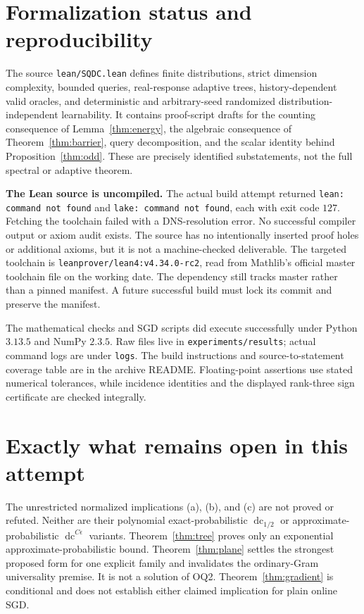 \documentclass[11pt]{article}
\DeclareMathOperator{\dc}{dc}
\newcommand{\1}{\mathbf 1}
\begin{document}
\section{Formalization status and reproducibility}
The source \texttt{lean/SQDC.lean} defines finite distributions, strict dimension complexity, bounded queries, real-response adaptive trees, history-dependent valid oracles, and deterministic and arbitrary-seed randomized distribution-independent learnability. It contains proof-script drafts for the counting consequence of Lemma~\ref{thm:energy}, the algebraic consequence of Theorem~\ref{thm:barrier}, query decomposition, and the scalar identity behind Proposition~\ref{thm:odd}. These are precisely identified substatements, not the full spectral or adaptive theorem.

\textbf{The Lean source is uncompiled.} The actual build attempt returned \texttt{lean: command not found} and \texttt{lake: command not found}, each with exit code $127$. Fetching the toolchain failed with a DNS-resolution error. No successful compiler output or axiom audit exists. The source has no intentionally inserted proof holes or additional axioms, but it is not a machine-checked deliverable. The targeted toolchain is \texttt{leanprover/lean4:v4.34.0-rc2}, read from Mathlib's official master toolchain file on the working date. The dependency still tracks master rather than a pinned manifest. A future successful build must lock its commit and preserve the manifest.

The mathematical checks and SGD scripts did execute successfully under Python $3.13.5$ and NumPy $2.3.5$. Raw files live in \texttt{experiments/results}; actual command logs are under \texttt{logs}. The build instructions and source-to-statement coverage table are in the archive README. Floating-point assertions use stated numerical tolerances, while incidence identities and the displayed rank-three sign certificate are checked integrally.

\section{Exactly what remains open in this attempt}
The unrestricted normalized implications (a), (b), and (c) are not proved or refuted. Neither are their polynomial exact-probabilistic $\dc_{1/2}$ or approximate-probabilistic $\dc^{C\epsilon}$ variants. Theorem~\ref{thm:tree} proves only an exponential approximate-probabilistic bound. Theorem~\ref{thm:plane} settles the strongest proposed form for one explicit family and invalidates the ordinary-Gram universality premise. It is not a solution of OQ2. Theorem~\ref{thm:gradient} is conditional and does not establish either claimed implication for plain online SGD.
\end{document}
